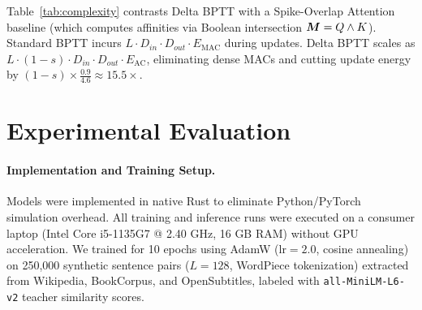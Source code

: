 \documentclass[runningheads]{llncs}
\begin{document}
\begin{table}[t]
\caption{Theoretical complexity and operation count comparison per sequence of length $L$ and dimension $D$. $s$ denotes spike sparsity ($s \approx 0.67$). Energy is computed with 45\,nm CMOS proxies ($E_{\text{MAC}} = 4.6$\,pJ, $E_{\text{AC}} = 0.9$\,pJ) \cite{horowitz2014computing}.}\label{tab:complexity}
\centering
{}
\end{table}

Table~\ref{tab:complexity} contrasts Delta BPTT with a Spike-Overlap Attention baseline (which computes affinities via Boolean intersection $\boldsymbol{M} = Q \wedge K$). Standard BPTT incurs $L \cdot D_{in} \cdot D_{out} \cdot E_{\text{MAC}}$ during updates. Delta BPTT scales as $L \cdot (1-s) \cdot D_{in} \cdot D_{out} \cdot E_{\text{AC}}$, eliminating dense MACs and cutting update energy by $(1-s) \times \frac{0.9}{4.6} \approx 15.5\times$.

\section{Experimental Evaluation}

\paragraph{Implementation and Training Setup.} Models were implemented in native Rust to eliminate Python/PyTorch simulation overhead. All training and inference runs were executed on a consumer laptop (Intel Core i5-1135G7 @ 2.40 GHz, 16 GB RAM) without GPU acceleration. We trained for 10 epochs using AdamW ($\text{lr}=2.0$, cosine annealing) on 250,000 synthetic sentence pairs ($L=128$, WordPiece tokenization) extracted from Wikipedia, BookCorpus, and OpenSubtitles, labeled with \texttt{all-MiniLM-L6-v2} teacher similarity scores.
\end{document}
